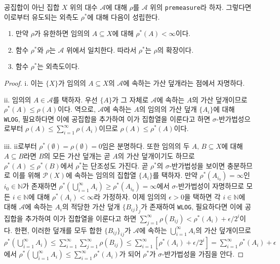 \begin{proposition}\label{prop:outerMeasure}
    공집합이 아닌 집합 $X$ 위의 대수 $\mathcal{A}$에 대해 $\rho$를 $\mathcal{A}$ 위의 \texttt{premeasure}라 하자. 그렇다면 이로부터 유도되는 외측도 $\rho^*$에 대해 다음이 성립한다.
    \begin{enumerate}
        \item 만약 $\rho$가 유한하면 임의의 $A\subseteq X$에 대해 $\rho^*(A)<\infty$이다.
        \item 함수 $\rho^*$와 $\rho$는 $\mathcal{A}$ 위에서 일치한다. 따라서 $\rho^*$는 $\rho$의 확장이다.
        \item 함수 $\rho^*$는 외측도이다.
    \end{enumerate}
\end{proposition}

\begin{proof}
    i. 이는 $\{X\}$가 임의의 $A\subseteq X$의 $\mathcal{A}$에 속하는 가산 덮개라는 점에서 자명하다.

    ii. 임의의 $A\in\mathcal{A}$를 택하자. 우선 $\{A\}$가 그 자체로 $\mathcal{A}$에 속하는 $A$의 가산 덮개이므로 $\rho^*(A)\leq\rho(A)$이다. 역으로, $\mathcal{A}$에 속하는 $A$의 임의의 가산 덮개 $\{A_i\}$에 대해 \texttt{WLOG}, 필요하다면 이에 공집합을 추가하여 이가 집합열을 이룬다고 하면 $\sigma$-반가법성으로부터 $\rho(A)\leq\sum_{i=1}^\infty\rho(A_i)$이므로 $\rho(A)\leq\rho^*(A)$이다.

    iii. ii로부터 $\rho^*(\emptyset)=\rho(\emptyset)=0$임은 분명하다. 또한 임의의 두 $A,\,B\subseteq X$에 대해 $A\subseteq B$라면 $B$의 모든 가산 덮개는 곧 $A$의 가산 덮개이기도 하므로 $\rho^*(A)\leq\rho^*(B)$에서 $\rho^*$는 단조성도 가진다. 곧 $\rho^*$의 $\sigma$-반가법성을 보이면 충분하므로 이를 위해 $\mathcal{P}(X)$에 속하는 임의의 집합열 $\{A_i\}$를 택하자. 만약 $\rho^*(A_{i_0})=\infty$인 $i_0\in\mathbb{N}$가 존재하면 $\rho^*(\bigcup_{i=1}^\infty A_i)\geq\rho^*(A_{i_0})=\infty$에서 $\sigma$-반가법성이 자명하므로 모든 $i\in\mathbb{N}$에 대해 $\rho^*(A_i)<\infty$라 가정하자. 이제 임의의 $\epsilon>0$을 택하면 각 $i\in\mathbb{N}$에 대해 $\mathcal{A}$에 속하는 $A_i$의 적당한 가산 덮개 $\{B_{ij}\}_j$가 존재하여 \texttt{WLOG}, 필요하다면 이에 공집합을 추가하여 이가 집합열을 이룬다고 하면 $\sum_{j=1}^\infty\rho(B_{ij})<\rho^*(A_i)+\epsilon/2^i$이다. 한편, 이러한 덮개를 모두 합한 $\{B_{ij}\}_{ij}$가 $\mathcal{A}$에 속하는 $\bigcup_{i=1}^\infty A_i$의 가산 덮개이므로 $\rho^*(\bigcup_{i=1}^\infty A_i)\leq\sum_{i=1}^\infty\sum_{j=1}^\infty\rho(B_{ij})\leq\sum_{i=1}^\infty[\rho^*(A_i)+\epsilon/2^i]=\sum_{i=1}^\infty\rho^*(A_i)+\epsilon$에서 $\rho^*(\bigcup_{i=1}^\infty A_i)\leq\sum_{i=1}^\infty\rho^*(A_i)$가 되어 $\rho^*$가  $\sigma$-반가법성을 가짐을 안다.
\end{proof}

